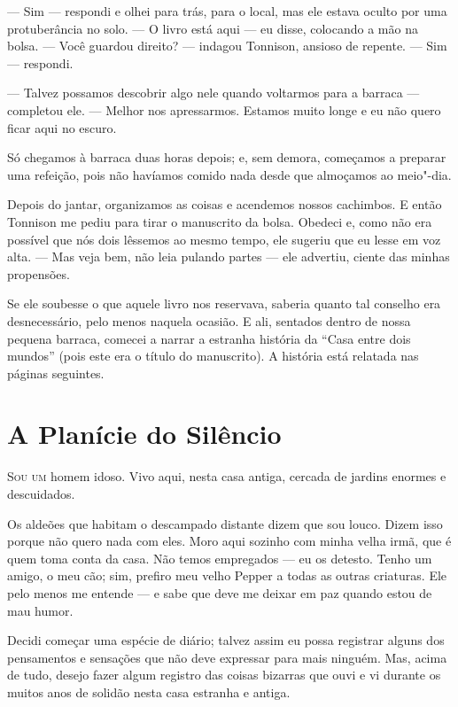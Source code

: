 --- Sim --- respondi e olhei para trás, para o local, mas ele estava oculto por uma protuberância no solo. --- O livro está
aqui ---  eu disse, colocando a mão na bolsa. --- Você guardou direito? --- indagou Tonnison, ansioso de repente.
--- Sim --- respondi.

--- Talvez possamos descobrir algo nele quando voltarmos para a barraca --- completou ele. --- Melhor nos
apressarmos. Estamos muito longe e eu não quero ficar aqui no escuro.

Só chegamos à barraca duas horas depois; e, sem demora, começamos a preparar uma refeição, pois não havíamos comido nada
desde que almoçamos ao meio"-dia.

Depois do jantar, organizamos as coisas e acendemos nossos cachimbos. E então Tonnison me pediu para tirar o manuscrito
da bolsa. Obedeci e, como não era possível que nós dois lêssemos ao mesmo tempo, ele sugeriu que eu lesse em voz alta.
--- Mas veja bem, não leia pulando partes --- ele advertiu, ciente das minhas propensões.

Se ele soubesse o que aquele livro nos reservava, saberia quanto tal conselho era desnecessário, pelo menos
naquela ocasião. E ali, sentados dentro de nossa pequena barraca, comecei a narrar a estranha história da
``Casa entre dois mundos'' (pois este era o título do manuscrito). A história está relatada nas páginas
seguintes. 


\clearpage

\chapter{A Planície do Silêncio}

\textsc{Sou um} homem idoso. Vivo aqui, nesta casa antiga, cercada de jardins enormes e descuidados.

Os aldeões que habitam o descampado distante dizem que sou louco. Dizem isso porque não quero nada com eles. Moro aqui
sozinho com minha velha irmã, que é quem toma conta da casa. Não temos empregados --- eu os detesto. Tenho um amigo, o
meu cão; sim, prefiro meu velho Pepper a todas as outras criaturas. Ele pelo menos me entende --- e sabe que deve me
deixar em paz quando estou de mau humor.

Decidi começar uma espécie de diário; talvez assim eu possa registrar alguns dos pensamentos e sensações que não deve
expressar para mais ninguém. Mas, acima de tudo, desejo fazer algum registro das coisas bizarras que ouvi e vi durante
os muitos anos de solidão nesta casa estranha e antiga.

